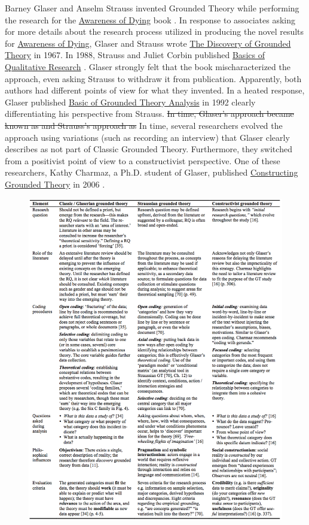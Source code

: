Barney Glaser and Anselm Strauss invented Grounded Theory while performing the research for the \ul{Awareness of Dying} book \cite{GlaserAwarenessOfDying}. In response to associates asking for more details about the research process utilized in producing the novel results for \ul{Awareness of Dying}, Glaser and Strauss wrote \ul{The Discovery of Grounded Theory} \cite{GlaserDiscovery} in 1967. In 1988, Strauss and Juliet Corbin published \ul{Basics of Qualitative Research} \cite{Strauss1988Basics}. Glaser strongly felt that the book mischaracterized the approach, even asking Strauss to withdraw it from publication. Apparently, both authors had different points of view for what they invented. In a heated response, Glaser published \ul{Basic of Grounded Theory Analysis} in 1992 clearly differentiating his perspective from Strauss. \sout{In time, Glaser's approach became known as  and Strauss's approach as } In time, several researchers evolved the approach using variations (such as recording an interview) that Glaser clearly describes as not part of Classic Grounded Theory. Furthermore, they switched from a positivist point of view to a constructivist perspective. One of these researchers, Kathy Charmaz, a Ph.D. student of Glaser, published \ul{Constructing Grounded Theory} in 2006 \cite{Charmaz}. 

\begin{figure}[t]
\centering
{}
\label{GroundedTheoryComparison}
\includegraphics[width=6.4in]{grounded_theory_images/stohl_grounded_theory_comparison.png}
\end{figure}

